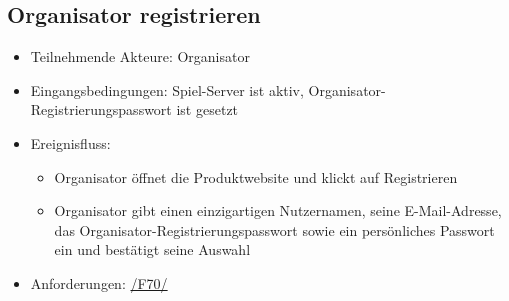 \documentclass[a4paper]{scrreprt}
\begin{document}

    \subsection{Organisator registrieren}
    \begin{itemize}
        \item Teilnehmende Akteure: \Gls{Organisator}
        \item Eingangsbedingungen: \Gls{Spiel-Server} ist aktiv, Organisator-Registrierungspasswort ist gesetzt
        \item Ereignisfluss:
        \begin{itemize}
            \item \Gls{Organisator} öffnet die Produktwebsite und klickt auf Registrieren
            \item \Gls{Organisator} gibt einen einzigartigen Nutzernamen, seine E-Mail-Adresse, das Organisator-Registrierungspasswort sowie ein persönliches Passwort ein und bestätigt seine Auswahl
        \end{itemize}
        \item Anforderungen: \hyperlink{F70}{/F70/}
    \end{itemize}
\end{document}
